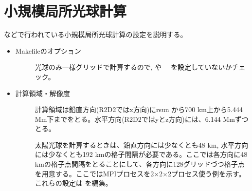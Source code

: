 \documentclass[letterpaper,10pt,dvipdfmx,report]{sphinxmanual}
\begin{document}
\section{小規模局所光球計算}
\label{\detokenize{typical_case:id2}}
 などで行われている小規模局所光球計算の設定を説明する。
\begin{itemize}
\item {} \begin{description}
\item[{Makefileのオプション}] \leavevmode
光球のみ一様グリッドで計算するので,  や　 を設定していないかチェック。

\end{description}

\item {} \begin{description}
\item[{計算領域・解像度}] \leavevmode
計算領域は鉛直方向(R2D2ではx方向)にrsun から700 km上から5.444 Mm下までをとる。水平方向(R2D2ではyとz方向)には、6.144 Mmずつとる。

太陽光球を計算するときは、鉛直方向には少なくとも48 km, 水平方向には少なくとも192 kmの格子間隔が必要である。ここでは各方向に48 kmの格子点間隔をとることにして、各方向に128グリッドづつ格子点を用意する。ここではMPIプロセスを2×2×2プロセス使う例を示す。これらの設定は  を編集。

\begin{sphinxVerbatim}[commandchars=\\\{\}]
      
      
           
           


\end{sphinxVerbatim}
\end{description}
\end{itemize}
\end{document}
